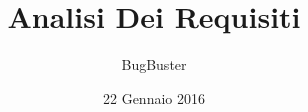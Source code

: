 



\title{\textbf{Analisi Dei Requisiti}}
\author{BugBuster}

\date{22 Gennaio 2016}




\makeFrontPage

\tableofcontents





